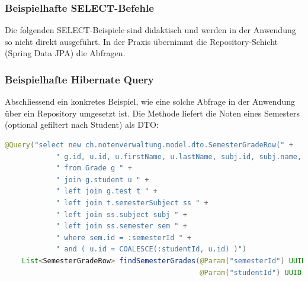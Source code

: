 \documentclass[12pt,a4paper]{article}
\begin{document}

    \subsubsection{Beispielhafte SELECT-Befehle}
    Die folgenden SELECT-Beispiele sind didaktisch und werden in der Anwendung so nicht direkt ausgeführt. In der Praxis übernimmt die Repository-Schicht (Spring Data JPA) die Abfragen.
    

    \subsubsection{Beispielhafte Hibernate Query}
    Abschliessend ein konkretes Beispiel, wie eine solche Abfrage in der Anwendung über ein Repository umgesetzt ist.
    Die Methode liefert die Noten eines Semesters (optional gefiltert nach Student) als DTO:
    \begin{lstlisting}[language=Java]
    @Query("select new ch.notenverwaltung.model.dto.SemesterGradeRow(" +
            " g.id, u.id, u.firstName, u.lastName, subj.id, subj.name, t.id, t.name, t.date, g.value, g.weight, g.comment) " +
            " from Grade g " +
            " join g.student u " +
            " left join g.test t " +
            " left join t.semesterSubject ss " +
            " left join ss.subject subj " +
            " left join ss.semester sem " +
            " where sem.id = :semesterId " +
            " and ( u.id = COALESCE(:studentId, u.id) )")
    List<SemesterGradeRow> findSemesterGrades(@Param("semesterId") UUID semesterId,
                                              @Param("studentId") UUID studentId);
    \end{lstlisting}
\end{document}
